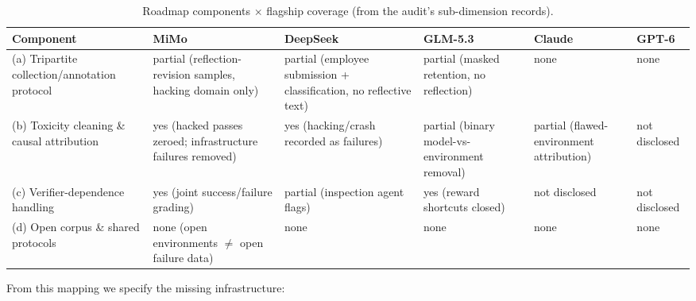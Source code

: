 \documentclass[10pt]{article}
\begin{document}
\begin{table}[t]
\centering
\caption{Roadmap components $\times$ flagship coverage (from the audit's sub-dimension records).}
\label{tab:roadmap}
\footnotesize
\setlength{\tabcolsep}{3.5pt}
\begin{tabular}{p{3.2cm}p{2.4cm}p{2.4cm}p{2.4cm}p{1.9cm}p{1.9cm}}
\toprule
Component & MiMo & DeepSeek & GLM-5.3 & Claude & GPT-6 \\
\midrule
(a) Tripartite collection/annotation protocol & partial (reflection-revision samples, hacking domain only) & partial (employee submission + classification, no reflective text) & partial (masked retention, no reflection) & none & none \\
(b) Toxicity cleaning \& causal attribution & yes (hacked passes zeroed; infrastructure failures removed) & yes (hacking/crash recorded as failures) & partial (binary model-vs-environment removal) & partial (flawed-environment attribution) & not disclosed \\
(c) Verifier-dependence handling & yes (joint success/failure grading) & partial (inspection agent flags) & yes (reward shortcuts closed) & not disclosed & not disclosed \\
(d) Open corpus \& shared protocols & none (open environments $\neq$ open failure data) & none & none & none & none \\
\bottomrule
\end{tabular}
\end{table}

From this mapping we specify the missing infrastructure:
\end{document}
